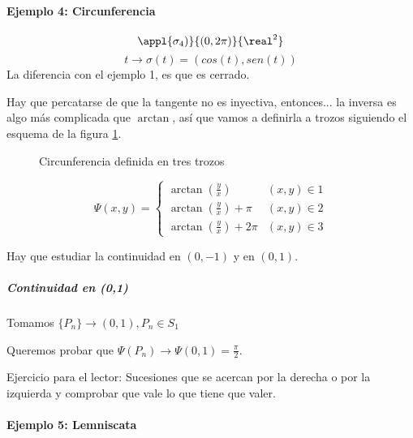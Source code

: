 \paragraph{Ejemplo 4: Circunferencia}
\[\appl{\sigma_4)}{(0,2\pi)}{\real^2}\]
\[t \rightarrow \sigma(t) = (cos(t),sen(t))\]
La diferencia con el ejemplo 1, es que es cerrado.

Hay que percatarse de que la tangente no es inyectiva, entonces... la inversa es algo más complicada que $\arctan$, así que vamos a definirla a trozos siguiendo el esquema de la figura \ref{imgCirc_2}.

\begin{figure}[hbtp]
\begin{center}
\caption{Circunferencia definida en tres trozos}
\label{imgCirc_2}
\end{center}
\end{figure}


\[\Psi(x,y) =
\begin{cases}
\arctan\left(\frac{y}{x}\right) & (x,y)\in 1\\
\arctan\left(\frac{y}{x}\right) + \pi & (x,y) \in 2\\
\arctan\left(\frac{y}{x}\right)+2\pi& (x,y) \in 3
\end{cases}
\]

Hay que estudiar la continuidad en $(0,-1)$ y en $(0,1)$.

\subparagraph{Continuidad en (0,1)}

Tomamos $\{P_n\} \rightarrow (0,1), P_n \in S_1$

Queremos probar que $\Psi(P_n) \rightarrow \Psi(0,1) = \frac{\pi}{2}$.

Ejercicio para el lector: 
Sucesiones que se acercan por la derecha o por la izquierda y comprobar que vale lo que tiene que valer.		

\paragraph{Ejemplo 5: Lemniscata}

